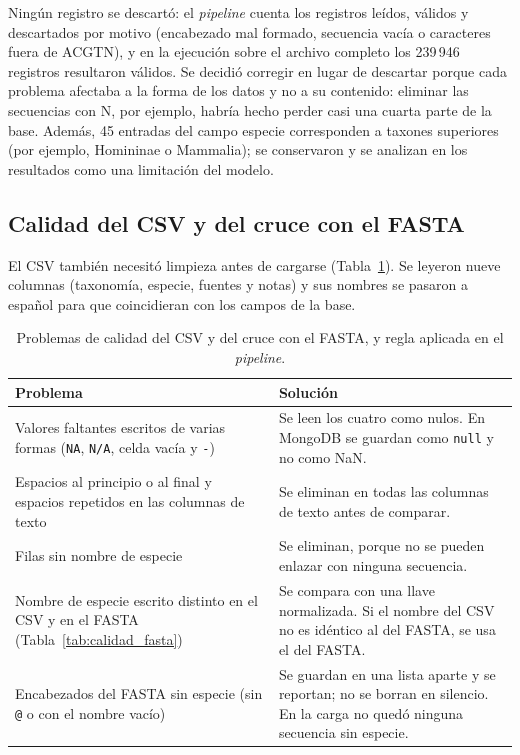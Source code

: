 Ningún registro se descartó: el \textit{pipeline} cuenta los registros
leídos, válidos y descartados por motivo (encabezado mal formado,
secuencia vacía o caracteres fuera de ACGTN), y en la ejecución sobre el
archivo completo los 239\,946 registros resultaron válidos. Se decidió
corregir en lugar de descartar porque cada problema afectaba a la forma
de los datos y no a su contenido: eliminar las secuencias con N, por
ejemplo, habría hecho perder casi una cuarta parte de la base. Además,
45 entradas del campo especie corresponden a taxones superiores (por
ejemplo, Homininae o Mammalia); se conservaron y se analizan en los
resultados como una limitación del modelo.

\subsection*{Calidad del CSV y del cruce con el FASTA}

El CSV también necesitó limpieza antes de cargarse
(Tabla~\ref{tab:calidad_csv}). Se leyeron nueve columnas (taxonomía,
especie, fuentes y notas) y sus nombres se pasaron a español para que
coincidieran con los campos de la base.

\begin{table}[htbp]
\centering
\caption{Problemas de calidad del CSV y del cruce con el FASTA, y regla
aplicada en el \textit{pipeline}.}
\label{tab:calidad_csv}
\small
\setlength{\tabcolsep}{4pt}
\begin{tabular}{p{4.6cm}p{6.6cm}}
\hline
\textbf{Problema} & \textbf{Solución} \\
\hline
Valores faltantes escritos de varias formas (\texttt{NA}, \texttt{N/A},
celda vacía y \texttt{-}) &
Se leen los cuatro como nulos. En MongoDB se guardan como \texttt{null}
y no como NaN. \\
Espacios al principio o al final y espacios repetidos en las columnas de
texto &
Se eliminan en todas las columnas de texto antes de comparar. \\
Filas sin nombre de especie &
Se eliminan, porque no se pueden enlazar con ninguna secuencia. \\
Nombre de especie escrito distinto en el CSV y en el FASTA
(Tabla~\ref{tab:calidad_fasta}) &
Se compara con una llave normalizada. Si el nombre del CSV no es
idéntico al del FASTA, se usa el del FASTA. \\
Encabezados del FASTA sin especie (sin \texttt{@} o con el nombre
vacío) &
Se guardan en una lista aparte y se reportan; no se borran en silencio.
En la carga no quedó ninguna secuencia sin especie. \\
\hline
\end{tabular}
\end{table}

